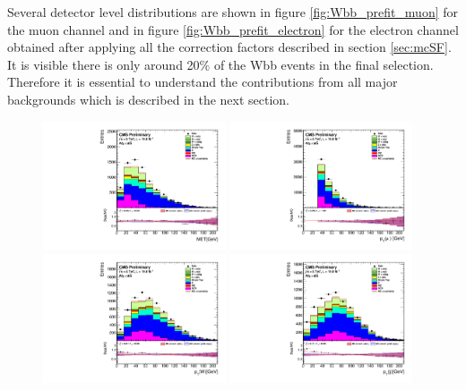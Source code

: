 Several detector level distributions are shown in figure \ref{fig:Wbb_prefit_muon} for the muon channel and in figure \ref{fig:Wbb_prefit_electron} for the electron channel obtained after applying all the correction factors described in section \ref{sec:mcSF}. It is visible there is only around 20$\%$ of the Wbb events in the final selection. Therefore it is essential to understand the contributions from all major backgrounds which is described in the next section. 
\begin{figure}[htbp]
	\centering
		\includegraphics[width=0.48\textwidth]{Figures/Results/Muon/prefit/Wbb_GetMET_doQCD1.pdf}
		\includegraphics[width=0.48\textwidth]{Figures/Results/Muon/prefit/Wbb_vLepton_pt_doQCD1.pdf}
		\includegraphics[width=0.48\textwidth]{Figures/Results/Muon/prefit/Wbb_GetWpt_doQCD1.pdf}
		\includegraphics[width=0.48\textwidth]{Figures/Results/Muon/prefit/Wbb_H_pt_doQCD1.pdf}

\end{figure}
